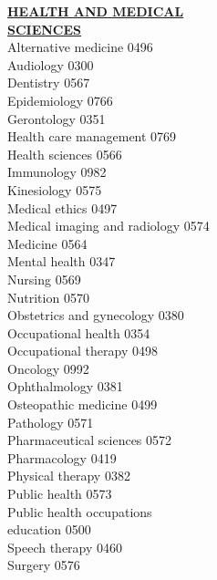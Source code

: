 \documentclass[9pt]{article}
\newcommand{\categoryheading}[1]{{\fontsize{8}{11}\selectfont \textbf{\uline{#1}}}}
\begin{document}
\begin{multicols}{3}
\categoryheading{HEALTH AND MEDICAL \leavevmode \\
SCIENCES} \leavevmode \\
Alternative medicine \hfill 0496 \leavevmode \\
Audiology \hfill 0300 \leavevmode \\
Dentistry \hfill 0567 \leavevmode \\
Epidemiology \hfill 0766 \leavevmode \\
Gerontology \hfill 0351 \leavevmode \\
Health care management \hfill 0769 \leavevmode \\
Health sciences \hfill 0566 \leavevmode \\
Immunology \hfill 0982 \leavevmode \\
Kinesiology \hfill 0575 \leavevmode \\
Medical ethics \hfill 0497 \leavevmode \\
Medical imaging and radiology \hfill 0574 \leavevmode \\
Medicine \hfill 0564 \leavevmode \\
Mental health \hfill 0347 \leavevmode \\
Nursing \hfill 0569 \leavevmode \\
Nutrition \hfill 0570 \leavevmode \\
Obstetrics and gynecology \hfill 0380 \leavevmode \\
Occupational health \hfill 0354 \leavevmode \\
Occupational therapy \hfill 0498 \leavevmode \\
Oncology \hfill 0992 \leavevmode \\
Ophthalmology \hfill 0381 \leavevmode \\
Osteopathic medicine \hfill 0499 \leavevmode \\
Pathology \hfill 0571 \leavevmode \\
Pharmaceutical sciences \hfill 0572 \leavevmode \\
Pharmacology \hfill 0419 \leavevmode \\
Physical therapy \hfill 0382 \leavevmode \\
Public health \hfill 0573 \leavevmode \\
Public health occupations \\
education \hfill 0500 \leavevmode \\
Speech therapy \hfill 0460 \leavevmode \\
Surgery \hfill 0576 \leavevmode \\

\end{multicols}
\end{document}
